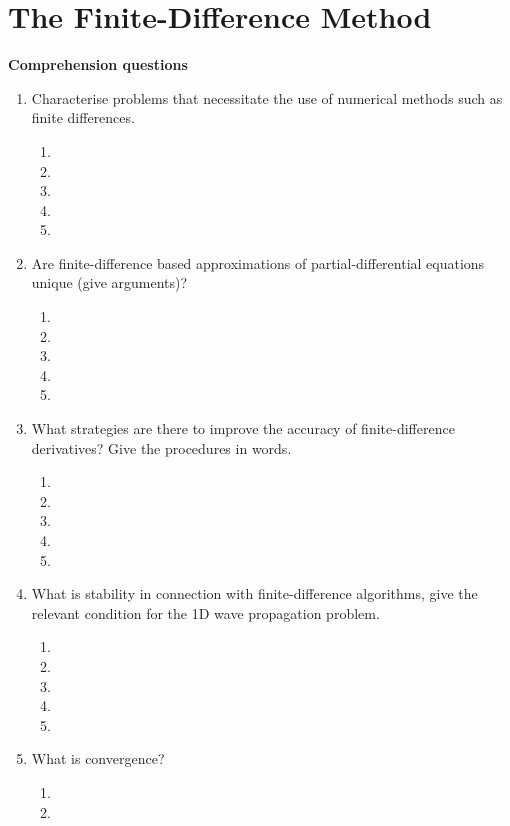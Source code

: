 
\chapter{The Finite-Difference Method} 

{\bf Comprehension questions}
\begin{enumerate}
\item Characterise problems that necessitate the use of numerical methods such as finite differences.
\begin{enumerate}
\item[]
\item[]
\item[] 
\item[]
\item[] 
\end{enumerate}
\item Are finite-difference based approximations of partial-differential equations unique (give arguments)?
\begin{enumerate}
\item[]
\item[]
\item[] 
\item[]
\item[] 
\end{enumerate}
\item What strategies are there to improve the accuracy of finite-difference derivatives? Give the procedures in words.
\begin{enumerate}
\item[]
\item[]
\item[] 
\item[]
\item[] 
\end{enumerate}
\item	What is stability in connection with finite-difference algorithms, give the relevant condition for the 1D wave propagation problem. 
\begin{enumerate}
\item[]
\item[]
\item[] 
\item[]
\item[] 
\end{enumerate}
\item What is convergence? 
\begin{enumerate}
\item[]
\item[]

\end{enumerate}
\end{enumerate}
